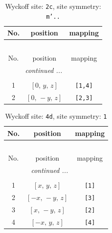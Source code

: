 \documentclass[fleqn,8pt]{jsarticle}
\begin{document}
\begin{longtable}{ccc}
\caption{Wyckoff site: {\tt 2c}, site symmetry: {\tt m'..}}
 \\
 \hline \hline
No. & position & mapping \\ \hline \endfirsthead

\multicolumn{2}{l}{\tablename\ \thetable{}} \\
 \hline \hline
No. & position & mapping \\ \hline \endhead

 \hline \hline
\multicolumn{2}{r}{\footnotesize\it continued ...} \\ \endfoot

 \hline \hline
\multicolumn{2}{r}{} \\ \endlastfoot

1 & $\left[ 0,\, y,\, z \right]$ & {\tt [1,4]} \\ \hline
2 & $\left[ 0,\, - y,\, z \right]$ & {\tt [2,3]} \\
\end{longtable}
\renewcommand{\arraystretch}{1.2}
\begin{longtable}{ccc}
\caption{Wyckoff site: {\tt 4d}, site symmetry: {\tt 1}}
 \\
 \hline \hline
No. & position & mapping \\ \hline \endfirsthead

\multicolumn{2}{l}{\tablename\ \thetable{}} \\
 \hline \hline
No. & position & mapping \\ \hline \endhead

 \hline \hline
\multicolumn{2}{r}{\footnotesize\it continued ...} \\ \endfoot

 \hline \hline
\multicolumn{2}{r}{} \\ \endlastfoot

1 & $\left[ x,\, y,\, z \right]$ & {\tt [1]} \\ \hline
2 & $\left[ - x,\, - y,\, z \right]$ & {\tt [3]} \\ \hline
3 & $\left[ x,\, - y,\, z \right]$ & {\tt [2]} \\ \hline
4 & $\left[ - x,\, y,\, z \right]$ & {\tt [4]} \\
\end{longtable}
\end{document}

